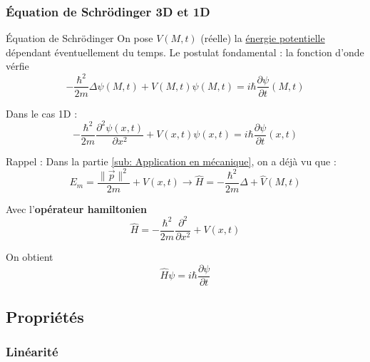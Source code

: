 \subsubsection{Équation de Schrödinger 3D et 1D} %

\begin{Theorem}{Équation de Schrödinger}{}
On pose $V(M,t)$ (réelle) la \underline{énergie potentielle} dépendant éventuellement du temps.
Le postulat fondamental : la fonction d'onde vérfie
\begin{equation}
  - \frac{\hbar ^{2}}{2m}  \Delta \psi(M,t) + V(M,t) \psi(M,t) = i \hbar \frac{\partial \psi}{\partial t} (M,t)
\end{equation}

Dans le cas 1D : 
\begin{equation}
  - \frac{\hbar ^{2}}{2m}  \frac{\partial  ^{2} \psi(x,t)}{\partial x ^{2}}  + V(x,t) \psi(x,t) = i \hbar \frac{\partial \psi}{\partial t} (x,t)
\end{equation}
\end{Theorem}

Rappel : Dans la partie \ref{sub: Application en mécanique}, on a déjà vu que : 
\begin{equation}
  E_m = \frac{ \| \overrightarrow{p} \| ^{2}}{2m} + V(x,t)\to \hat{H} = - \frac{\hbar ^{2}}{2m} \Delta + \hat{V}(M,t)
\end{equation}

\begin{Theorem}{}{}
Avec l'\textbf{opérateur hamiltonien} 
\begin{equation}
  \hat{H} = - \frac{\hbar ^{2}}{2m}  \frac{\partial ^{2}}{\partial x ^{2}}  + V(x,t)
\end{equation}

On obtient 
\begin{equation}
  \hat{H} \psi = i \hbar \frac{\partial \psi}{\partial t} 
\end{equation}
\end{Theorem}


\subsection{Propriétés} %



\subsubsection{Linéarité} %
\label{sub:Linéarité}


